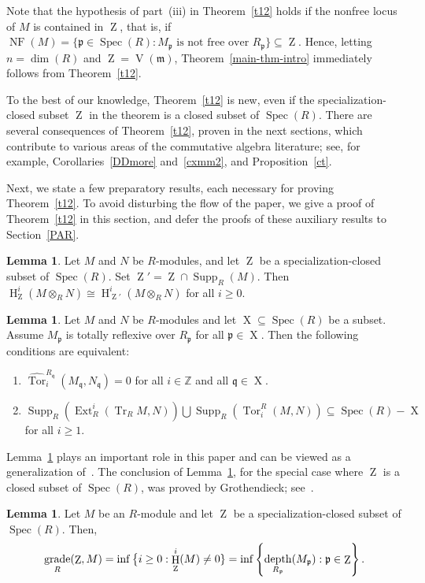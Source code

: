 \documentclass[11pt]{amsart}
\theoremstyle{definition}
\theoremstyle{definition}
\newtheorem{lem}[thm]{Lemma}
\numberwithin{equation}{section}
\newcommand{\fm}{\mathfrak{m}}
\newcommand{\fp}{\mathfrak{p}}
\newcommand{\fq}{\mathfrak{q}}
\newcommand{\ZZ}{\mathbb{Z}}
\DeclareMathOperator{\gr}{\textnormal{grade}}
\DeclareMathOperator{\Tr}{Tr}
\DeclareMathOperator{\X}{X}
\DeclareMathOperator{\V}{V}
\DeclareMathOperator{\mz}{Z}
\DeclareMathOperator{\depth}{depth}
\DeclareMathOperator{\Ext}{Ext}
\DeclareMathOperator{\hh}{H}
\DeclareMathOperator{\Supp}{Supp}
\DeclareMathOperator{\Spec}{Spec}
\DeclareMathOperator{\Tor}{Tor}
\DeclareMathOperator{\NF}{NF}
\begin{document}
Note that the hypothesis of part~(iii) in Theorem~\ref{t12} holds if the nonfree locus of $M$ is contained in $\mz$, that is, if $\NF(M)=\{\fp \in \Spec(R) : M_{\fp} \text{ is not free over } R_{\fp} \} \subseteq \mz$. Hence, letting $n=\dim(R)$ and $\mz=\V(\fm)$, Theorem~\ref{main-thm-intro} immediately follows from Theorem~\ref{t12}.

To the best of our knowledge, Theorem~\ref{t12} is new, even if the specialization-closed subset $\mz$ in the theorem is a closed subset of $\Spec(R)$. There are several consequences of Theorem~\ref{t12}, proven in the next sections, which contribute to various areas of the commutative algebra literature; see, for example, Corollaries~\ref{DDmore} and~\ref{cxmm2}, and Proposition~\ref{ct}.

Next, we state a few preparatory results, each necessary for proving Theorem~\ref{t12}. To avoid disturbing the flow of the paper, we give a proof of Theorem~\ref{t12} in this section, and defer the proofs of these auxiliary results to Section~\ref{PAR}.

\begin{lem} \label{lem1} Let $M$ and $N$ be $R$-modules, and let $\mz$ be a specialization-closed subset of $\Spec(R)$. Set $\mz'=\mz\cap\Supp_R(M)$. Then $\hh^i_{\mz}(M\otimes_RN)\cong\hh^i_{\mz'}(M\otimes_RN)$ for all $i\geq 0$.
\end{lem}

\begin{lem}\label{pr} Let $M$ and $N$ be $R$-modules and let $\X\subseteq \Spec(R)$ be a subset. Assume $M_\fp$ is totally reflexive over $R_\fp$ for all $\fp\in\X$. Then  the following conditions are equivalent:
\begin{enumerate}[\rm(i)]
\item $\widehat{\Tor}_i^{R_\fq}(M_\fq,N_\fq)=0$ for all $i\in\ZZ$ and all $\fq\in\X$.
\item $\Supp_R\left(\Ext^i_R(\Tr_R M,N)\right)\bigcup\Supp_R\left(\Tor_i^R(M,N)\right)\subseteq \Spec(R)-\X $ for all $i\geq 1$. 
\end{enumerate}
\end{lem}

Lemma~\ref{grz} plays an important role in this paper and can be viewed as a generalization of~\cite[4.1]{TTY}. The conclusion of Lemma~\ref{grz}, for the special case where $\mz$ is a closed subset of $\Spec(R)$, was proved by Grothendieck; see~\cite[III.2.9]{sga2}.  

\begin{lem}\label{grz} Let $M$ be an $R$-module and let $\mz$ be a specialization-closed subset of $\Spec(R)$. Then,
$$\gr_R(\mz,M)=\inf\big\{i\geq 0 : \hh_{\mz}^{i}(M)\neq0\}=\inf \left\{ \depth_{R_{\fp}}(M_{\fp}): \fp\in\mz \right\}.$$
\end{lem}
\end{document}
